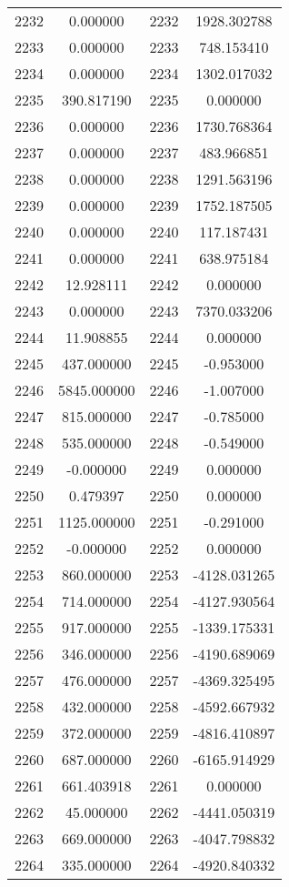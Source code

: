 \documentclass[12pt]{article}
\begin{document}
\begin{longtable}{@{}cccc@{}}
2232 & 0.000000 & 2232 & 1928.302788 \\
2233 & 0.000000 & 2233 & 748.153410 \\
2234 & 0.000000 & 2234 & 1302.017032 \\
2235 & 390.817190 & 2235 & 0.000000 \\
2236 & 0.000000 & 2236 & 1730.768364 \\
2237 & 0.000000 & 2237 & 483.966851 \\
2238 & 0.000000 & 2238 & 1291.563196 \\
2239 & 0.000000 & 2239 & 1752.187505 \\
2240 & 0.000000 & 2240 & 117.187431 \\
2241 & 0.000000 & 2241 & 638.975184 \\
2242 & 12.928111 & 2242 & 0.000000 \\
2243 & 0.000000 & 2243 & 7370.033206 \\
2244 & 11.908855 & 2244 & 0.000000 \\
2245 & 437.000000 & 2245 & -0.953000 \\
2246 & 5845.000000 & 2246 & -1.007000 \\
2247 & 815.000000 & 2247 & -0.785000 \\
2248 & 535.000000 & 2248 & -0.549000 \\
2249 & -0.000000 & 2249 & 0.000000 \\
2250 & 0.479397 & 2250 & 0.000000 \\
2251 & 1125.000000 & 2251 & -0.291000 \\
2252 & -0.000000 & 2252 & 0.000000 \\
2253 & 860.000000 & 2253 & -4128.031265 \\
2254 & 714.000000 & 2254 & -4127.930564 \\
2255 & 917.000000 & 2255 & -1339.175331 \\
2256 & 346.000000 & 2256 & -4190.689069 \\
2257 & 476.000000 & 2257 & -4369.325495 \\
2258 & 432.000000 & 2258 & -4592.667932 \\
2259 & 372.000000 & 2259 & -4816.410897 \\
2260 & 687.000000 & 2260 & -6165.914929 \\
2261 & 661.403918 & 2261 & 0.000000 \\
2262 & 45.000000 & 2262 & -4441.050319 \\
2263 & 669.000000 & 2263 & -4047.798832 \\
2264 & 335.000000 & 2264 & -4920.840332 \\

\end{longtable}
\end{document}
